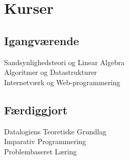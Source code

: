 \documentclass[]{plushcv}
\begin{document}
\begin{minipage}[t]{0.25\textwidth}


\section{Kurser}

\subsection{Igangværende}
Sandsynlighedsteori og Linear Algebra \textbullet{}\\
Algoritmer og Datastrukturer \textbullet{}\\
Internetværk og Web-programmering\\

 \subsection{Færdiggjort}

Datalogiens Teoretiske Grundlag \textbullet{}\\
Imparativ Programmering \textbullet{}\\
Problembaseret Læring\\


\end{minipage} 
\end{document}
